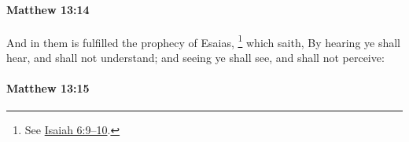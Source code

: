 		\paragraph{Matthew 13:14} %
			\label{MATTHEW-13-14}

			And in them is fulfilled the prophecy of Esaias,%
				\footnote{%
					See \hyperref[ISAIAH-6-9]{Isaiah 6:9--10}.
					}
			which saith, By hearing ye shall hear, and shall not understand; and seeing ye shall see, and shall not perceive:

			\begin{framed}
			\scriptsize
				\begin{compactdesc}
					\item[SBLG] 
				\end{compactdesc}
			\end{framed}

		\paragraph{Matthew 13:15} %
			\label{MATTHEW-13-15}

